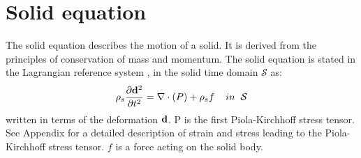 \section{Solid equation}
The solid equation describes the motion of a solid. It is derived from the principles of conservation of mass and momentum. The solid equation is stated in the Lagrangian reference system \cite{Richter2016}, in the solid time domain $\mathcal{S}$ as:
\begin{equation}\label{eq:Solid}
\rho_s \frac{\partial \bold{d}^2}{\partial t^2} = \nabla \cdot ( P ) + \rho_s f  \hspace{4mm} in \hspace{2mm} \mathcal{S}
\end{equation}
written in terms of the deformation $\bold{d}$. 
P is the first Piola-Kirchhoff stress tensor. See Appendix for a detailed description of strain and stress leading to the Piola-Kirchhoff stress tensor. 
$f$ is a force acting on the solid body.


\begin{comment}
\subsection*{Locking}
The problem og shear locking can happen FEM computations with certain elements. 
[mek4250 Kent] - Locking occurs if  $ \lambda >> \nu $ that is, the material is nearly incompressible. The reason is that all the elements discussed in this course are poor at approximating the divergence. Locking refers to the case where the displacement is to small because the divergence term essentially lock the displacement. It is a numerical artifact not a physical feature. [Verbatum]
\end{comment}
